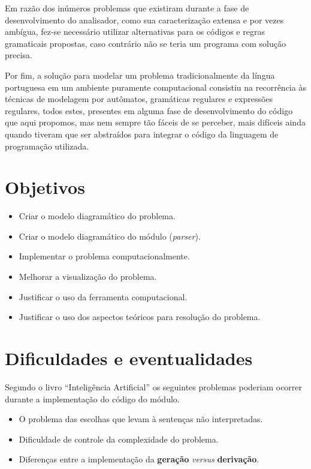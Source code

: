 \documentclass[12pt,a4paper,oneside,english,brazilian,brazil]{abntex2}
\begin{document}
\par Em razão  dos inúmeros problemas que existiram durante a fase de desenvolvimento do analisador, como sua caracterização extensa e por vezes ambígua, fez-se necessário utilizar alternativas para os códigos e regras gramaticais propostas, caso contrário não se teria um programa com solução precisa.\

\par Por fim, a solução para modelar um problema tradicionalmente da língua portuguesa em um ambiente puramente computacional consistiu na recorrência às técnicas de modelagem por autômatos, gramáticas regulares e expressões regulares, todos estes, presentes em alguma fase de desenvolvimento do código que aqui propomos, mas nem sempre tão fáceis de se perceber, mais difíceis ainda quando tiveram que ser abstraídos para integrar o código da linguagem de programação utilizada.\

\chapter{Objetivos}

\begin{itemize}
\item Criar o modelo diagramático do problema.
\item Criar o modelo diagramático do módulo (\textit{parser}).
\item Implementar o problema computacionalmente.
\item Melhorar a visualização do problema.
\item Justificar o uso da ferramenta computacional.
\item Justificar o uso dos aspectos teóricos para resolução do problema.
\end{itemize}

\chapter{Dificuldades e eventualidades}

Segundo o livro ``Inteligência Artificial'' \cite{luger} os seguintes problemas poderiam ocorrer durante a implementação do código do módulo.

\begin{itemize}
\item O problema das escolhas que levam à sentenças não interpretadas.
\item Dificuldade de controle da complexidade do problema.
\item Diferenças entre a implementação da \textbf{geração} \textit{versus}  \textbf{derivação}.
\end{itemize}
\end{document}
